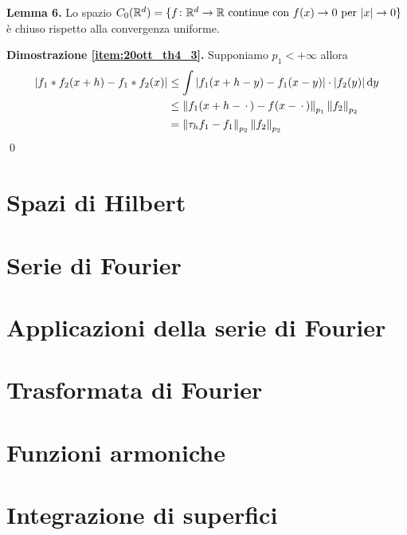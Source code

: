 \documentclass[a4paper, 12pt]{report}
\begin{document}
\textbf{Lemma 6.}
Lo spazio $C_0(\mathbb R^d) = \{ f \colon \mathbb R^d \to \mathbb R \text{ continue con } f(x) \to 0 \text{ per } |x| \to 0 \}$ è chiuso rispetto alla convergenza uniforme.

\textbf{Dimostrazione \ref{item:20ott_th4_3}.} 
Supponiamo $p_1 < +\infty$ allora
$$
\begin{aligned}
	|f_1 \ast f_2(x + h) - f_1 \ast f_2(x)|
	&\leq \int |f_1(x + h - y) - f_1(x - y)| \cdot |f_2(y)| \,\mathrm{d} y \\
	&\leq \left\lVert f_1(x + h - \,\cdot\,) - f(x - \,\cdot\,) \right\rVert_{p_1} \left\lVert f_2 \right\rVert_{p_2} \\
	&= \left\lVert \tau_h f_1 - f_1 \right\rVert_{p_2} \left\lVert f_2 \right\rVert_{p_2}
\end{aligned}
$$
\qed











\chapter{Spazi di Hilbert}


\chapter{Serie di Fourier}


\chapter{Applicazioni della serie di Fourier}


\chapter{Trasformata di Fourier}


\chapter{Funzioni armoniche}


\chapter{Integrazione di superfici}
\end{document}
